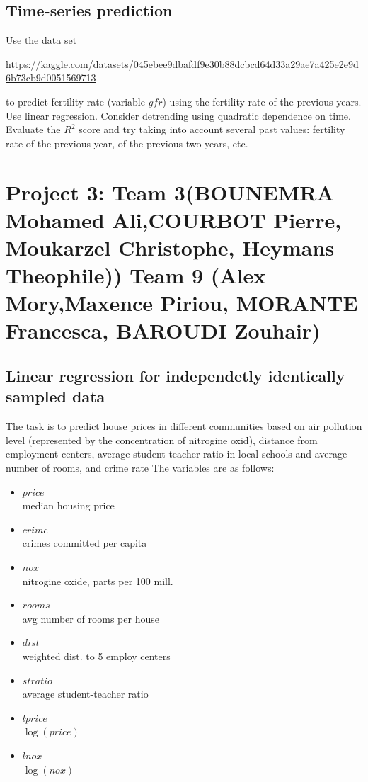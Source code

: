 \documentclass{article}
\begin{document}
 
 \subsection*{Time-series prediction}
 Use the data set  

   \url{https://kaggle.com/datasets/045ebee9dbafdf9e30b88dcbcd64d33a29ae7a425e2e9d6b73cb9d0051569713} 

   to predict fertility rate (variable $gfr$)
    using the fertility rate of the previous years. 
    Use linear regression. Consider detrending using quadratic dependence on time.  
   Evaluate the $R^2$ score and try taking into account several past values: fertility rate of the previous year, of the previous two years, etc. 



\section*{Project 3: Team 3(BOUNEMRA Mohamed Ali,COURBOT Pierre, Moukarzel Christophe,
Heymans Theophile)) Team 9 (Alex Mory,Maxence Piriou, MORANTE  Francesca, BAROUDI Zouhair) }




 \subsection*{Linear regression for independetly identically sampled data}
    The task is to predict house prices in different communities based on air pollution level (represented by the concentration of nitrogine oxid), 
distance from employment centers, average student-teacher ratio 
 in local schools and average number of rooms, and crime rate The variables are as follows:
    \begin{itemize}
    \item{$price$ \\}       
	median housing price
    \item{$crime$ \\}                    
		crimes committed per capita
    \item{$nox$ \\}                      
	nitrogine oxide, parts per 100 mill.
    \item{$rooms$ \\}                    
    avg number of rooms per house
    \item{$dist$ \\}                     
      weighted dist. to 5 employ centers
    \item{$stratio$ \\}                  average student-teacher ratio
    \item{$lprice$ \\}                   $\log(price)$
    \item{$lnox$ \\}                     $\log(nox)$
   \end{itemize}
\end{document}
